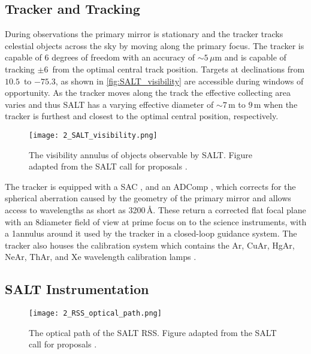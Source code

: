\subsection{Tracker and Tracking}

During observations the primary mirror is stationary and the tracker tracks celestial objects across the sky by moving along the primary focus.
The tracker is capable of $6$ degrees of freedom with an accuracy of $\sim 5$\,$\mu$m and is capable of tracking $\pm 6$\degree\ from the optimal central track position.
Targets at declinations from $10.5$\degree\ to $-75.3$\degree, as shown in \autoref{fig:SALT_visibility} are accessible during windows of opportunity.
As the tracker moves along the track the effective collecting area varies and thus \gls{SALT} has a varying effective diameter of $\sim 7$\,m to $9$\,m when the tracker is furthest and closest to the optimal central position, respectively.

\begin{figure}[t]
    \centering
    \texttt{[image: 2\_SALT\_visibility.png]}
    \caption{
        The visibility annulus of objects observable by \gls{SALT}.
        Figure adapted from the \gls{SALT} call for proposals \citep{SALT_CFP}.
    }
    \label{fig:SALT_visibility}
\end{figure}


The tracker is equipped with a \gls{SAC} \citep{SALT_SAC}, and an \gls{ADComp} \citep{SALT_ADC}, which corrects for the spherical aberration caused by the geometry of the primary mirror and allows access to wavelengths as short as 3200\,\AA.
These return a corrected flat focal plane with an 8\arcmin diameter field of view at prime focus on to the science instruments, with a 1\arcmin annulus around it used by the tracker in a closed-loop guidance system.
The tracker also houses the calibration system which contains the \gls{Ar}, \gls{CuAr}, \gls{HgAr}, \gls{NeAr}, \gls{ThAr}, and \gls{Xe} wavelength calibration lamps \citep{SALT_cal_sys}.

\subsection[SALT Instrumentation]{\gls{SALT} Instrumentation} \label{subsec:SALT_instr}

\begin{figure}[t]
    \centering
    \texttt{[image: 2\_RSS\_optical\_path.png]}
    \caption{
        The optical path of the \gls{SALT} \gls{RSS}.
        Figure adapted from the \gls{SALT} call for proposals \citep{SALT_CFP}.
    }
    \label{fig:RSS_layout}
\end{figure}

